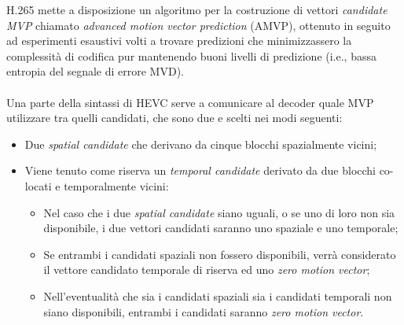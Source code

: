 H.265 mette a disposizione un algoritmo per la costruzione di vettori 
\emph{candidate MVP} chiamato \emph{advanced motion vector prediction} (AMVP), 
ottenuto in seguito ad esperimenti esaustivi volti a trovare predizioni che 
minimizzassero la complessità di codifica pur mantenendo buoni livelli di 
predizione (i.e., bassa entropia del segnale di errore MVD).
\\ \\
Una parte della sintassi di HEVC serve a comunicare al decoder quale MVP 
utilizzare tra quelli candidati, che sono due e scelti nei modi seguenti:
\begin{itemize}
\item Due \emph{spatial candidate} che derivano da cinque blocchi spazialmente 
vicini;
\item Viene tenuto come riserva un \emph{temporal candidate} derivato da due 
blocchi co-locati e temporalmente vicini:
\begin{itemize}
\item Nel caso che i due \emph{spatial candidate} siano uguali, o se uno di loro
 non sia disponibile, i due vettori candidati saranno uno spaziale e uno 
temporale;

\item Se entrambi i candidati spaziali non fossero disponibili, verrà 
considerato il vettore candidato temporale di riserva ed uno 
\emph{zero motion vector};

\item Nell'eventualità che sia i candidati spaziali sia i candidati temporali 
non siano disponibili, entrambi i candidati saranno \emph{zero motion vector}.
\end{itemize}
\end{itemize}

